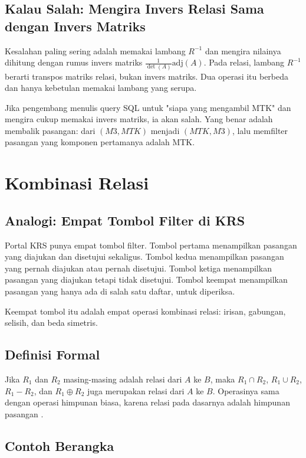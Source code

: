 \documentclass[11pt,a4paper]{article}
\begin{document}
\subsection{Kalau Salah: Mengira Invers Relasi Sama dengan Invers Matriks}

Kesalahan paling sering adalah memakai lambang $R^{-1}$ dan mengira nilainya dihitung dengan rumus invers matriks $\frac{1}{\det(A)}\text{adj}(A)$. Pada relasi, lambang $R^{-1}$ berarti transpos matriks relasi, bukan invers matriks. Dua operasi itu berbeda dan hanya kebetulan memakai lambang yang serupa.

Jika pengembang menulis query SQL untuk "siapa yang mengambil MTK" dan mengira cukup memakai invers matriks, ia akan salah. Yang benar adalah membalik pasangan: dari $(M3, MTK)$ menjadi $(MTK, M3)$, lalu memfilter pasangan yang komponen pertamanya adalah MTK.

\section{Kombinasi Relasi}

\subsection{Analogi: Empat Tombol Filter di KRS}

Portal KRS punya empat tombol filter. Tombol pertama menampilkan pasangan yang diajukan dan disetujui sekaligus. Tombol kedua menampilkan pasangan yang pernah diajukan atau pernah disetujui. Tombol ketiga menampilkan pasangan yang diajukan tetapi tidak disetujui. Tombol keempat menampilkan pasangan yang hanya ada di salah satu daftar, untuk diperiksa.

Keempat tombol itu adalah empat operasi kombinasi relasi: irisan, gabungan, selisih, dan beda simetris.

\subsection{Definisi Formal}

Jika $R_1$ dan $R_2$ masing-masing adalah relasi dari $A$ ke $B$, maka $R_1 \cap R_2$, $R_1 \cup R_2$, $R_1-R_2$, dan $R_1 \oplus R_2$ juga merupakan relasi dari $A$ ke $B$. Operasinya sama dengan operasi himpunan biasa, karena relasi pada dasarnya adalah himpunan pasangan \cite{rosen}.

\subsection{Contoh Berangka}
\end{document}
